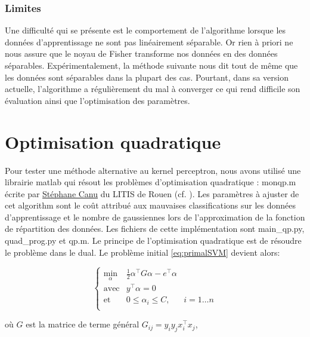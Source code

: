 \documentclass{article}
\begin{document}
\subsubsection{Limites}
Une difficulté qui se présente est le comportement de l'algorithme lorsque les données d'apprentissage ne sont pas linéairement séparable. Or rien à priori ne nous assure que le noyau de Fisher transforme nos données en des données séparables. Expérimentalement, la méthode suivante nous dit tout de même que les données sont séparables dans la plupart des cas. Pourtant, dans sa version actuelle, l'algorithme a régulièrement du mal à converger ce qui rend difficile son évaluation ainsi que l'optimisation des paramètres.

\section{Optimisation quadratique}
\label{optquad}
Pour tester une méthode alternative au kernel perceptron, nous avons utilisé une librairie matlab qui résout les problèmes d'optimisation quadratique : monqp.m écrite par \href{http://asi.insa-rouen.fr/enseignants/~scanu/SVM/}{Stéphane Canu} du LITIS de Rouen (cf. \cite{Canu}).
Les paramètres à ajuster de cet algorithm sont le coût attribué aux mauvaises classifications sur les données d'apprentissage et le nombre de gaussiennes lors de l'approximation de la fonction de répartition des données. Les fichiers de cette implémentation sont main\_qp.py, quad\_prog.py et qp.m.
Le principe de l'optimisation quadratique est de résoudre le problème dans le dual. Le problème initial \ref{eq:primalSVM} devient alors:

\begin{equation}
  \label{eq:dualSVM}
  \left\{
    \begin{array}{lll}
      \displaystyle\min_{\alpha}& \frac{1}{2} \alpha^\top  G \alpha - e^\top  \alpha&\\
      \mbox{avec} &y^\top  \alpha = 0 &\\
      \mbox{et} &0 \leq \alpha_i \leq C,& i=1 \dots n \\
    \end{array}
  \right.
\end{equation}

où $G$ est la matrice de terme général $G_{ij} =  y_i y_j x_i^\top x_j$,

\end{document}
